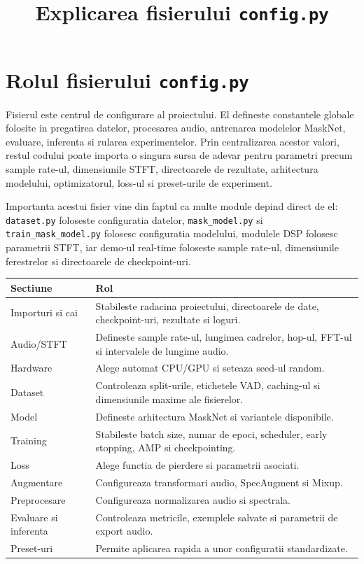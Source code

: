 \documentclass[12pt,a4paper]{report}
\title{Explicarea fisierului \texttt{config.py}}
\author{}
\date{}
\begin{document}
\maketitle
\tableofcontents
\clearpage

\chapter{Rolul fisierului \texttt{config.py}}

Fisierul  este centrul de configurare al proiectului. El
defineste constantele globale folosite in pregatirea datelor, procesarea audio,
antrenarea modelelor MaskNet, evaluare, inferenta si rularea experimentelor.
Prin centralizarea acestor valori, restul codului poate importa o singura sursa
de adevar pentru parametri precum sample rate-ul, dimensiunile STFT, directoarele
de rezultate, arhitectura modelului, optimizatorul, loss-ul si preset-urile de
experiment.

Importanta acestui fisier vine din faptul ca multe module depind direct de el:
\texttt{dataset.py} foloseste configuratia datelor, \texttt{mask\_model.py} si
\texttt{train\_mask\_model.py} folosesc configuratia modelului, modulele DSP
folosesc parametrii STFT, iar demo-ul real-time foloseste sample rate-ul,
dimensiunile ferestrelor si directoarele de checkpoint-uri.

\begin{longtable}{p{}p{}}
\toprule
\textbf{Sectiune} & \textbf{Rol} \\
\midrule
\endhead
Importuri si cai & Stabileste radacina proiectului, directoarele de date,
checkpoint-uri, rezultate si loguri. \\
Audio/STFT & Defineste sample rate-ul, lungimea cadrelor, hop-ul, FFT-ul si
intervalele de lungime audio. \\
Hardware & Alege automat CPU/GPU si seteaza seed-ul random. \\
Dataset & Controleaza split-urile, etichetele VAD, caching-ul si dimensiunile
maxime ale fisierelor. \\
Model & Defineste arhitectura MaskNet si variantele disponibile. \\
Training & Stabileste batch size, numar de epoci, scheduler, early stopping,
AMP si checkpointing. \\
Loss & Alege functia de pierdere si parametrii asociati. \\
Augmentare & Configureaza transformari audio, SpecAugment si Mixup. \\
Preprocesare & Configureaza normalizarea audio si spectrala. \\
Evaluare si inferenta & Controleaza metricile, exemplele salvate si parametrii
de export audio. \\
Preset-uri & Permite aplicarea rapida a unor configuratii standardizate. \\
\bottomrule
\end{longtable}
\end{document}
